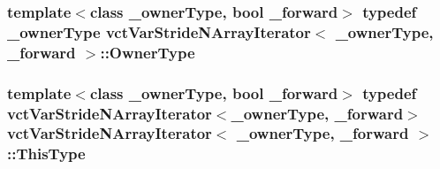 \subsubsection[{Owner\+Type}]{\setlength{\rightskip}{0pt plus 5cm}template$<$class \+\_\+owner\+Type, bool \+\_\+forward$>$ typedef \+\_\+owner\+Type {\bf vct\+Var\+Stride\+N\+Array\+Iterator}$<$ \+\_\+owner\+Type, \+\_\+forward $>$\+::{\bf Owner\+Type}}\label{classvct_var_stride_n_array_iterator_ace0aaa36ae04ab580bdc4b41540f5da8}
\hypertarget{classvct_var_stride_n_array_iterator_ae02517903d76b5ea390357e329d7d234}{}
\subsubsection[{This\+Type}]{\setlength{\rightskip}{0pt plus 5cm}template$<$class \+\_\+owner\+Type, bool \+\_\+forward$>$ typedef {\bf vct\+Var\+Stride\+N\+Array\+Iterator}$<$\+\_\+owner\+Type, \+\_\+forward$>$ {\bf vct\+Var\+Stride\+N\+Array\+Iterator}$<$ \+\_\+owner\+Type, \+\_\+forward $>$\+::{\bf This\+Type}}\label{classvct_var_stride_n_array_iterator_ae02517903d76b5ea390357e329d7d234}



